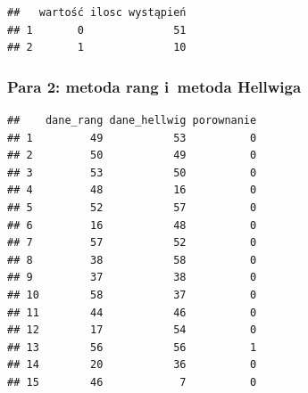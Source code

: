 \documentclass[12pt,a4paper]{report}
\begin{document}
{\begin{verbatim}
##   wartość ilosc wystąpień
## 1       0              51
## 2       1              10
\end{verbatim}

\subsubsection{Para 2: metoda rang i~metoda
Hellwiga}%

\begin{Shaded}
\begin{Highlighting}[]
\NormalTok{(}\NormalTok{,}\NormalTok{)}

\NormalTok{:}
\NormalTok{\{}
  \NormalTok{\{}
  \NormalTok{\}}
\NormalTok{\}}
\NormalTok{)}
\end{Highlighting}
\end{Shaded}

\begin{verbatim}
##    dane_rang dane_hellwig porownanie
## 1         49           53          0
## 2         50           49          0
## 3         53           50          0
## 4         48           16          0
## 5         52           57          0
## 6         16           48          0
## 7         57           52          0
## 8         38           58          0
## 9         37           38          0
## 10        58           37          0
## 11        44           46          0
## 12        17           54          0
## 13        56           56          1
## 14        20           36          0
## 15        46            7          0
\end{verbatim}

\begin{Shaded}
\begin{Highlighting}[]
\NormalTok{(}
\NormalTok{(}\NormalTok{,}\NormalTok{)}
\end{Highlighting}
\end{Shaded}

}
\end{document}

